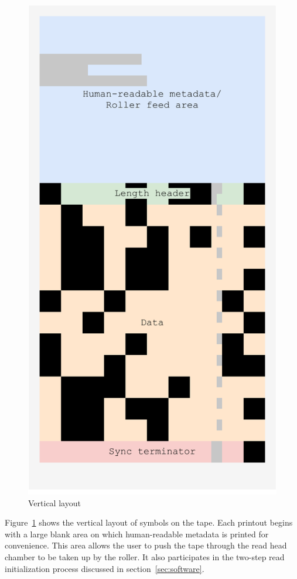 \documentclass{article}
\begin{document}
\begin{landscape}
\begin{figure}[h]
				\includegraphics[width=\linewidth]{img/vertical}
				\caption{Vertical layout}
				\label{fig:vertical}
			\endminipage
		\end{figure}
	\end{landscape}
	
	Figure~\ref{fig:vertical} shows the vertical layout of symbols on the tape.
	Each printout begins with a large blank area on which human-readable
	metadata is printed for convenience. This area allows the user to push the
	tape through the read head chamber to be taken up by the roller.
	It also participates in the two-step read initialization process discussed
	in section~\ref{sec:software}.
	
\end{document}
